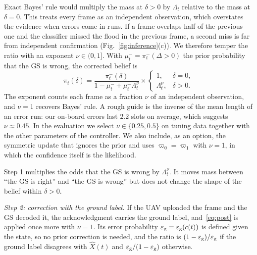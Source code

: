 Exact Bayes' rule would multiply the mass at $\delta>0$ by $\Lambda_t$ relative to the mass at $\delta=0$. This treats every frame as an independent observation, which overstates the evidence when errors come in runs. If a frame overlaps half of the previous one and the classifier missed the flood in the previous frame, a second miss is far from independent confirmation (Fig.~\ref{fig:inference}(c)). We therefore temper the ratio with an exponent $\nu\in(0,1]$. With $\mu^-_t=\pi^-_t(\Delta>0)$ the prior probability that the GS is wrong, the corrected belief is
\begin{equation}\label{eq:post}
\pi_t(\delta)=\frac{\pi^-_t(\delta)}{1-\mu^-_t+\mu^-_t\Lambda_t^{\nu}}\times\begin{cases}1, & \delta=0,\\ \Lambda_t^{\nu}, & \delta>0.\end{cases}
\end{equation}
The exponent counts each frame as a fraction $\nu$ of an independent observation, and $\nu=1$ recovers Bayes' rule. A rough guide is the inverse of the mean length of an error run: our on-board errors last $2.2$ slots on average, which suggests $\nu\approx0.45$. In the evaluation we select $\nu\in\{0.25,0.5\}$ on tuning data together with the other parameters of the controller. We also include, as an option, the symmetric update that ignores the prior and uses $\varpi_0=\varpi_1$ with $\nu=1$, in which the confidence itself is the likelihood.

Step 1 multiplies the odds that the GS is wrong by $\Lambda_t^{\nu}$. It moves mass between ``the GS is right'' and ``the GS is wrong'' but does not change the shape of the belief within $\delta>0$.

\emph{Step 2: correction with the ground label.} If the UAV uploaded the frame and the GS decoded it, the acknowledgment carries the ground label, and~\eqref{eq:post} is applied once more with $\nu=1$. Its error probability $\varepsilon_{\rm g}=\varepsilon_{\rm g}(c(t))$ is defined given the state, so no prior correction is needed, and the ratio is $(1-\varepsilon_{\rm g})/\varepsilon_{\rm g}$ if the ground label disagrees with $\hat X(t)$ and $\varepsilon_{\rm g}/(1-\varepsilon_{\rm g})$ otherwise.

